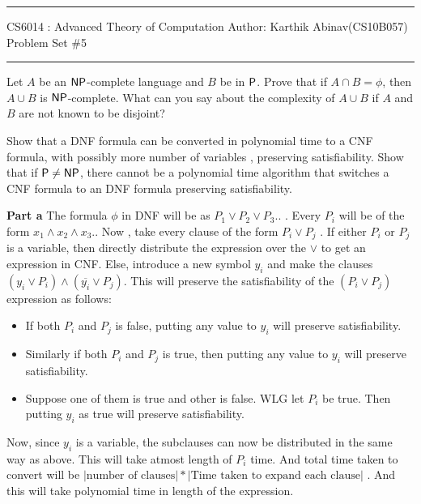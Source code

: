 \documentclass[12pt]{exam}
\begin{document}
\hrule
\vspace{3mm}
\noindent 
{\sf CS6014 : Advanced Theory of Computation  \hfill Author: Karthik Abinav(CS10B057)}
\vspace{3mm}\\
\noindent 
{\sf Problem Set \#5 }
\vspace{3mm}
\hrule

\begin{questions}

\question
Let $A$ be an $\NP$-complete language and $B$ be in $\P$. Prove that if $A \cap B = \phi$, then  $A \cup B$ is $\NP$-complete. What can you say about the complexity of $A \cup B$ if $A$ and $B$ are not known to be disjoint?

\question
Show that a {\sc DNF} formula can be converted in polynomial time to a {\sc CNF} formula, with possibly more number of variables , preserving satisfiability. Show that if $\P \ne \NP$, there cannot be a polynomial time algorithm that switches a {\sc CNF} formula to an {\sc DNF} formula preserving satisfiability.
\begin{solution}
\newline
\textbf{Part a} \newline
The formula $\phi$ in {\sc DNF} will be as $P_{1} \vee P_{2} \vee P_{3} .. $ . Every $P_{i}$ will be of the form $x_{1} \wedge x_{2} \wedge x_{3} ..$
Now , take every clause of the form $P_{i} \vee P_{j}$ . \newline
If either $P_{i}$ or $P_{j}$ is a variable, then directly distribute the expression over the $\vee$ to get an expression in {\sc CNF}. \newline
Else, introduce a new symbol $y_{i}$ and make the clauses $(y_{i} \vee P_{i}) \wedge (\overline{y_{i}} \vee P_{j})$. \newline
This will preserve the satisfiability of the $(P_{i} \vee P_{j})$ expression as follows:
\begin{itemize}
 \item If both $P_{i}$ and $P_{j}$ is false, putting any value to $y_{i}$ will preserve satisfiability.
 \item Similarly if both $P_{i}$ and $P_{j}$ is true, then putting any value to $y_{i}$ will preserve satisfiability.
 \item Suppose one of them is true and other is false. WLG let $P_{i}$ be true. Then putting $y_{i}$ as true will preserve satisfiability.
\end{itemize}

Now, since $y_{i}$ is a variable, the subclauses can now be distributed in the same way as above. This will take atmost length of $P_{i}$ time.
And total time taken to convert will be $|\text{number of clauses}| \ast |\text{Time taken to expand each clause}|$ . And this will 
take polynomial time in length of the expression.


\end{solution}
\end{questions}
\end{document}
